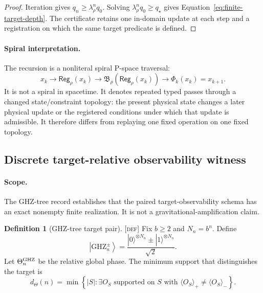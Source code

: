 \documentclass[11pt]{article}
\newcommand{\Reg}{\ensuremath{\mathsf{Reg}}}
\newcommand{\Bridge}{\ensuremath{\mathfrak{B}}}
\newcommand{\Defn}{\textsc{[def]}}
\theoremstyle{definition}
\newtheorem{sdefinition}{Definition}
\begin{document}
\begin{proof}
Iteration gives $q_n\ge\lambda_\rho^nq_0$.  Solving
$\lambda_\rho^nq_0\ge q_\star$ gives
Equation~\eqref{eq:finite-target-depth}.  The certificate retains one
in-domain update at each step and a registration on which the same target
predicate is defined.
\end{proof}

\paragraph{Spiral interpretation.}
The recursion is a nonliteral spiral P-space traversal:
\begin{equation}
x_k\longrightarrow\Reg_\rho(x_k)
\longrightarrow\Bridge_\rho\!\left(\Reg_\rho(x_k)\right)
\longrightarrow\Phi_k(x_k)=x_{k+1}.
\label{eq:spiral-state-update}
\end{equation}
It is not a spiral in spacetime.  It denotes repeated typed passes through a
changed state/constraint topology: the present physical state changes a later
physical update or the registered conditions under which that update is
admissible.  It therefore differs from replaying one fixed operation on one
fixed topology.

\subsection{Discrete target-relative observability witness}
\label{supp:ghz-tree-witness}

\paragraph{Scope.}
The GHZ-tree record establishes that the paired target-observability schema has
an exact nonempty finite realization.  It is not a gravitational-amplification
claim.

\begin{sdefinition}[GHZ-tree target pair]
\label{def:ghz-tree-target-pair}
\Defn{} Fix $b\ge2$ and $N_n=b^n$.  Define
\begin{equation}
\left|\mathrm{GHZ}^{\pm}_n\right\rangle=
\frac{|0\rangle^{\otimes N_n}\pm|1\rangle^{\otimes N_n}}{\sqrt2}.
\label{eq:ghz-pm}
\end{equation}
Let $\Theta^{\rm GHZ}_n$ be the relative global phase.  The minimum
support that distinguishes the target is
\begin{equation}
d_{\Theta}(n)=
\min\left\{|S|:\exists O_S\text{ supported on }S\text{ with }
\langle O_S\rangle_+\ne\langle O_S\rangle_-\right\}.
\label{eq:ghz-target-support}
\end{equation}
\end{sdefinition}
\end{document}
